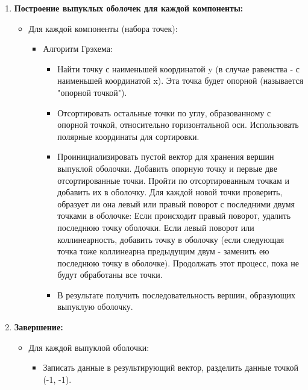 \documentclass[12pt]{article}
\begin{document}
\begin{enumerate}
    \item \textbf{Построение выпуклых оболочек для каждой компоненты:}
        \begin{itemize}
            \item Для каждой компоненты (набора точек):
                \begin{itemize}
                   \item Алгоритм Грэхема:
                    \begin{itemize}
                        \item Найти точку с наименьшей координатой y (в случае равенства - с наименьшей координатой x). Эта точка будет опорной (называется "опорной точкой").
                        \item Отсортировать остальные точки по углу, образованному с опорной точкой, относительно горизонтальной оси. Использовать полярные координаты для сортировки.
                        \item Проинициализировать пустой вектор для хранения вершин выпуклой оболочки. Добавить опорную точку и первые две отсортированные точки.
Пройти по отсортированным точкам и добавить их в оболочку. Для каждой новой точки проверить, образует ли она левый или правый поворот с последними двумя точками в оболочке:
Если происходит правый поворот, удалить последнюю точку оболочки.
Если левый поворот или коллинеарность, добавить точку в оболочку (если следующая точка тоже коллинеарна предыдущим двум - заменить ею последнюю точку в оболочке).
Продолжать этот процесс, пока не будут обработаны все точки.
                        \item В результате получить последовательность вершин, образующих выпуклую оболочку.
                    \end{itemize}
                 \end{itemize}
        \end{itemize}

    \item \textbf{Завершение:}
       \begin{itemize}
           \item Для каждой выпуклой оболочки:
            \begin{itemize}
                \item Записать данные в результирующий вектор, разделить данные точкой (-1, -1).
            \end{itemize}
       \end{itemize}

\end{enumerate}
\newpage
\end{document}
